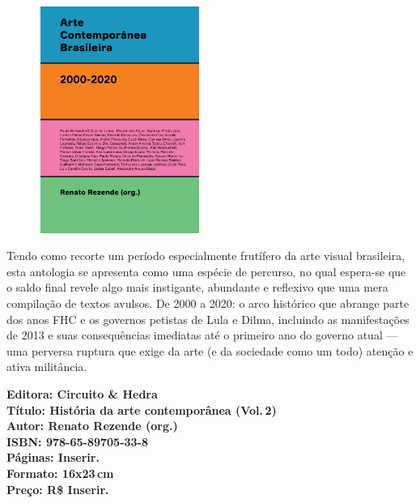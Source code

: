 \begin{center}
\hspace*{.5cm}\includegraphics[width=74mm]{./CAPAS/CIRCUITO_REZENDE.jpg}
\end{center}
\hspace*{-7cm}\hrulefill\hspace*{-7cm}
\medskip

\noindent{}Tendo como recorte um período especialmente frutífero da arte visual brasileira, esta antologia se apresenta como uma espécie de percurso, no qual espera-se que o saldo final revele algo mais instigante, abundante e reflexivo que uma mera compilação de textos avulsos.  De 2000 a 2020: o arco histórico que abrange parte dos anos FHC e os governos petistas de Lula e Dilma, incluindo as manifestações de 2013 e suas consequências imediatas até o primeiro ano do governo atual --- uma perversa ruptura que exige da arte (e da sociedade como um todo) atenção e ativa militância.

\vfill
\noindent\begin{minipage}[c]{1\linewidth}
{\small\textbf{
\hspace*{-.1cm}Editora: Circuito \& Hedra\\
Título: História da arte contemporânea (Vol.\,2)\\
Autor: Renato Rezende (org.)\\ 
ISBN: 978-65-89705-33-8\\
Páginas: Inserir.\\
Formato: 16x23\,cm\\
Preço: R\$ Inserir.\\
}}
\end{minipage}
\pagebreak

